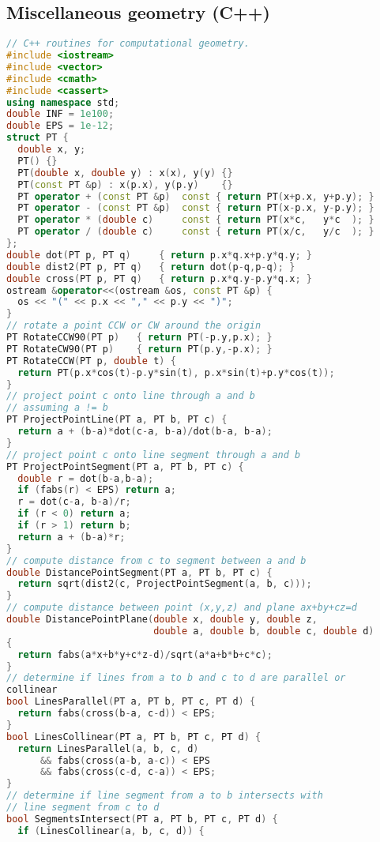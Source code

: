 \subsection{Miscellaneous geometry (C++)}
\begin{lstlisting}[language=C++]
// C++ routines for computational geometry.
#include <iostream>
#include <vector>
#include <cmath>
#include <cassert>
using namespace std;
double INF = 1e100;
double EPS = 1e-12;
struct PT { 
  double x, y; 
  PT() {}
  PT(double x, double y) : x(x), y(y) {}
  PT(const PT &p) : x(p.x), y(p.y)    {}
  PT operator + (const PT &p)  const { return PT(x+p.x, y+p.y); }
  PT operator - (const PT &p)  const { return PT(x-p.x, y-p.y); }
  PT operator * (double c)     const { return PT(x*c,   y*c  ); }
  PT operator / (double c)     const { return PT(x/c,   y/c  ); }
};
double dot(PT p, PT q)     { return p.x*q.x+p.y*q.y; }
double dist2(PT p, PT q)   { return dot(p-q,p-q); }
double cross(PT p, PT q)   { return p.x*q.y-p.y*q.x; }
ostream &operator<<(ostream &os, const PT &p) {
  os << "(" << p.x << "," << p.y << ")"; 
}
// rotate a point CCW or CW around the origin
PT RotateCCW90(PT p)   { return PT(-p.y,p.x); }
PT RotateCW90(PT p)    { return PT(p.y,-p.x); }
PT RotateCCW(PT p, double t) { 
  return PT(p.x*cos(t)-p.y*sin(t), p.x*sin(t)+p.y*cos(t)); 
}
// project point c onto line through a and b
// assuming a != b
PT ProjectPointLine(PT a, PT b, PT c) {
  return a + (b-a)*dot(c-a, b-a)/dot(b-a, b-a);
}
// project point c onto line segment through a and b
PT ProjectPointSegment(PT a, PT b, PT c) {
  double r = dot(b-a,b-a);
  if (fabs(r) < EPS) return a;
  r = dot(c-a, b-a)/r;
  if (r < 0) return a;
  if (r > 1) return b;
  return a + (b-a)*r;
}
// compute distance from c to segment between a and b
double DistancePointSegment(PT a, PT b, PT c) {
  return sqrt(dist2(c, ProjectPointSegment(a, b, c)));
}
// compute distance between point (x,y,z) and plane ax+by+cz=d
double DistancePointPlane(double x, double y, double z,
                          double a, double b, double c, double d)
{
  return fabs(a*x+b*y+c*z-d)/sqrt(a*a+b*b+c*c);
}
// determine if lines from a to b and c to d are parallel or 
collinear
bool LinesParallel(PT a, PT b, PT c, PT d) { 
  return fabs(cross(b-a, c-d)) < EPS; 
}
bool LinesCollinear(PT a, PT b, PT c, PT d) { 
  return LinesParallel(a, b, c, d)
      && fabs(cross(a-b, a-c)) < EPS
      && fabs(cross(c-d, c-a)) < EPS; 
}
// determine if line segment from a to b intersects with 
// line segment from c to d
bool SegmentsIntersect(PT a, PT b, PT c, PT d) {
  if (LinesCollinear(a, b, c, d)) {

\end{lstlisting}
